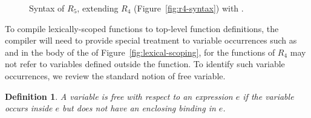 \documentclass[11pt]{book}
\newcommand{\gray}[1]{{\color{lightgray} #1}}
\newtheorem{definition}[theorem]{Definition}
\begin{document}
\begin{figure}[tp]
\centering
\fbox{
\begin{minipage}{0.96\textwidth}
\[
\begin{array}{lcl}
  \Type &::=& \gray{\key{Integer} \mid \key{Boolean}
     \mid (\key{Vector}\;\Type^{+}) \mid \key{Void}
     \mid (\Type^{*} \; \key{->}\; \Type)} \\
  \Exp &::=& \gray{\Int \mid (\key{read}) \mid (\key{-}\;\Exp)
     \mid (\key{+} \; \Exp\;\Exp) \mid (\key{-} \; \Exp\;\Exp)}  \\
    &\mid&  \gray{\Var \mid \LET{\Var}{\Exp}{\Exp}}\\
    &\mid& \gray{\key{\#t} \mid \key{\#f} 
     \mid (\key{and}\;\Exp\;\Exp) 
     \mid (\key{or}\;\Exp\;\Exp) 
     \mid (\key{not}\;\Exp) } \\
    &\mid& \gray{(\key{eq?}\;\Exp\;\Exp) \mid \IF{\Exp}{\Exp}{\Exp}} \\
    &\mid& \gray{(\key{vector}\;\Exp^{+}) \mid
          (\key{vector-ref}\;\Exp\;\Int)} \\
    &\mid& \gray{(\key{vector-set!}\;\Exp\;\Int\;\Exp)\mid (\key{void})} \\
    &\mid& \gray{(\Exp \; \Exp^{*})} \\
    &\mid& (\key{lambda:}\; ([\Var \key{:} \Type]^{*}) \key{:} \Type \; \Exp) \\
  \Def &::=& \gray{(\key{define}\; (\Var \; [\Var \key{:} \Type]^{*}) \key{:} \Type \; \Exp)} \\
  R_5 &::=& \gray{(\key{program} \; \Def^{*} \; \Exp)}
\end{array}
\]
\end{minipage}
}
\caption{Syntax of $R_5$, extending $R_4$ (Figure~\ref{fig:r4-syntax}) 
  with .}
\label{fig:r5-syntax}
\end{figure}

To compile lexically-scoped functions to top-level function
definitions, the compiler will need to provide special treatment to
variable occurrences such as  and  in the body of the
 of Figure~\ref{fig:lexical-scoping}, for the functions
of $R_4$ may not refer to variables defined outside the function. To
identify such variable occurrences, we review the standard notion of
free variable.

\begin{definition}
A variable is \emph{free with respect to an expression} $e$ if the
variable occurs inside $e$ but does not have an enclosing binding in
$e$.
\end{definition}
\end{document}
